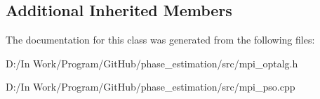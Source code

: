 \subsection*{Additional Inherited Members}


The documentation for this class was generated from the following files\+:\begin{DoxyCompactItemize}
\item 
D\+:/\+In Work/\+Program/\+Git\+Hub/phase\+\_\+estimation/src/mpi\+\_\+optalg.\+h\item 
D\+:/\+In Work/\+Program/\+Git\+Hub/phase\+\_\+estimation/src/mpi\+\_\+pso.\+cpp\end{DoxyCompactItemize}
